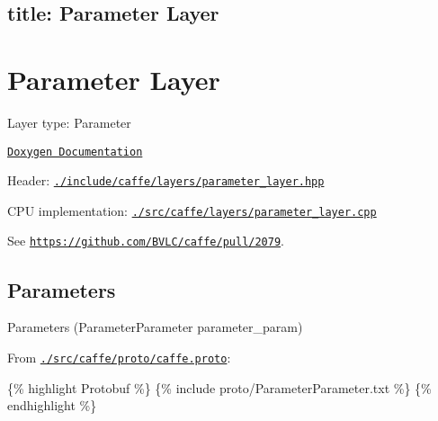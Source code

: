 

 \subsection*{title\+: Parameter Layer }

\section*{Parameter Layer}


\begin{DoxyItemize}
\item Layer type\+: {\ttfamily Parameter}
\item \href{http://caffe.berkeleyvision.org/doxygen/classcaffe_1_1ParameterLayer.html}{\tt Doxygen Documentation}
\item Header\+: \href{https://github.com/BVLC/caffe/blob/master/include/caffe/layers/parameter_layer.hpp}{\tt {\ttfamily ./include/caffe/layers/parameter\+\_\+layer.hpp}}
\item C\+PU implementation\+: \href{https://github.com/BVLC/caffe/blob/master/src/caffe/layers/parameter_layer.cpp}{\tt {\ttfamily ./src/caffe/layers/parameter\+\_\+layer.cpp}}
\end{DoxyItemize}

See \href{https://github.com/BVLC/caffe/pull/2079}{\tt https\+://github.\+com/\+B\+V\+L\+C/caffe/pull/2079}.

\subsection*{Parameters}


\begin{DoxyItemize}
\item Parameters ({\ttfamily Parameter\+Parameter parameter\+\_\+param})
\item From \href{https://github.com/BVLC/caffe/blob/master/src/caffe/proto/caffe.proto}{\tt {\ttfamily ./src/caffe/proto/caffe.proto}}\+:
\end{DoxyItemize}

\{\% highlight Protobuf \%\} \{\% include proto/\+Parameter\+Parameter.\+txt \%\} \{\% endhighlight \%\} 